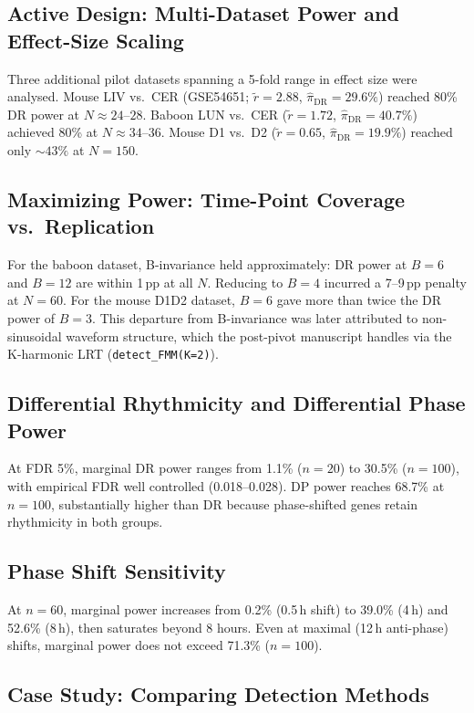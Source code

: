 \subsection*{Active Design: Multi-Dataset Power and Effect-Size Scaling}

Three additional pilot datasets spanning a 5-fold range in effect size were
analysed. Mouse LIV vs.\ CER (GSE54651; $\tilde{r} = 2.88$, $\hat{\pi}_{\mathrm{DR}} = 29.6\%$)
reached 80\% DR power at $N \approx 24$--$28$. Baboon LUN vs.\ CER
($\tilde{r} = 1.72$, $\hat{\pi}_{\mathrm{DR}} = 40.7\%$) achieved 80\% at
$N \approx 34$--$36$. Mouse D1 vs.\ D2 ($\tilde{r} = 0.65$,
$\hat{\pi}_{\mathrm{DR}} = 19.9\%$) reached only ${\sim}43\%$ at $N = 150$.

\subsection*{Maximizing Power: Time-Point Coverage vs.\ Replication}

For the baboon dataset, B-invariance held approximately: DR power at $B = 6$
and $B = 12$ are within 1\,pp at all $N$. Reducing to $B = 4$ incurred a
7--9\,pp penalty at $N = 60$. For the mouse D1D2 dataset, $B = 6$ gave more
than twice the DR power of $B = 3$. This departure from B-invariance was later
attributed to non-sinusoidal waveform structure, which the post-pivot
manuscript handles via the K-harmonic LRT (\texttt{detect\_FMM(K=2)}).

\subsection*{Differential Rhythmicity and Differential Phase Power}

At FDR 5\%, marginal DR power ranges from 1.1\% ($n = 20$) to 30.5\% ($n = 100$),
with empirical FDR well controlled (0.018--0.028). DP power reaches 68.7\% at
$n = 100$, substantially higher than DR because phase-shifted genes retain
rhythmicity in both groups.

\subsection*{Phase Shift Sensitivity}

At $n = 60$, marginal power increases from 0.2\% (0.5\,h shift) to 39.0\% (4\,h)
and 52.6\% (8\,h), then saturates beyond 8 hours. Even at maximal (12\,h
anti-phase) shifts, marginal power does not exceed 71.3\% ($n = 100$).

\subsection*{Case Study: Comparing Detection Methods}

